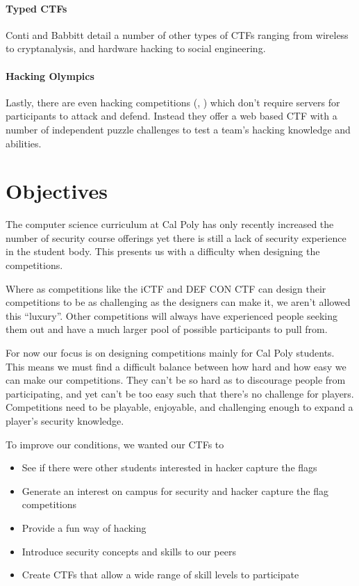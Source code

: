 \documentclass[10pt]{article}
\begin{document}
\paragraph*{Typed CTFs} Conti and Babbitt
\cite{HackingCompetitionsForSecurityEducation} detail a number of other types
of CTFs ranging from wireless to cryptanalysis, and hardware hacking to social
engineering.

\paragraph*{Hacking Olympics} \label{HackingOlympics} Lastly, there are even hacking 
competitions (\cite{Cipher}, \cite{SMPCTF}) which don't require servers for participants to
attack and defend. Instead they offer a web based CTF with a number of
independent puzzle challenges to test a team's hacking knowledge and abilities.

\section{Objectives}
\label{MainObjectives}
The computer science curriculum at Cal Poly has only recently increased the
number of security course offerings yet there is still a lack of security
experience in the student body. This presents us with a difficulty when designing
the competitions. 

Where as competitions like the iCTF and DEF CON CTF can design their
competitions to be as challenging as the designers can make it, we aren't
allowed this ``luxury''. Other competitions will always have experienced people
seeking them out and have a much larger pool of possible participants to pull
from.

For now our focus is on designing competitions mainly for Cal Poly students.
This means we must find a difficult balance between how hard and how easy we can
make our competitions. They can't be so hard as to discourage people from
participating, and yet can't be too easy such that there's no challenge for
players. Competitions need to be playable, enjoyable, and challenging enough to
expand a player's security knowledge.

To improve our conditions, we wanted our CTFs to

\begin{itemize}
    \item See if there were other students interested in hacker capture the flags
    \item Generate an interest on campus for security and hacker capture the 
      flag competitions
    \item Provide a fun way of hacking 
    \item Introduce security concepts and skills to our peers
    \item Create CTFs that allow a wide range of skill levels to participate
\end{itemize}
\end{document}
